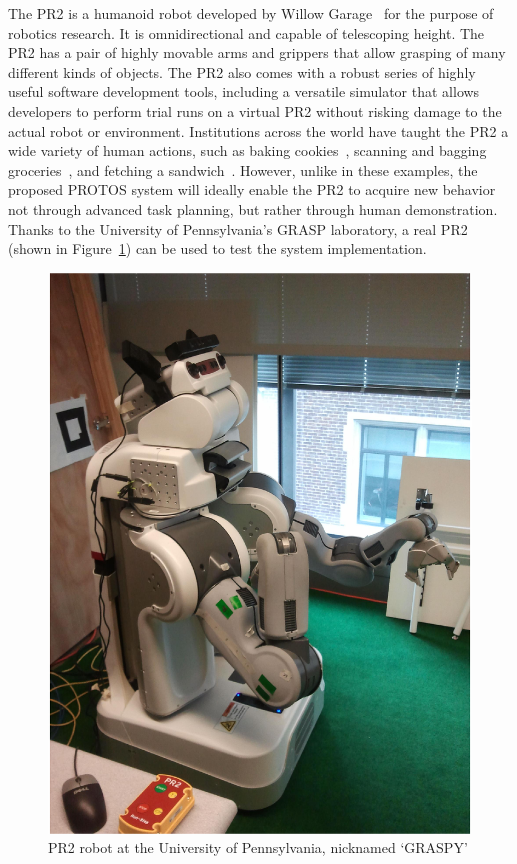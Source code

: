 \documentclass{sig-alternate}
\begin{document}
\indent The PR2 is a humanoid robot developed by  Willow Garage~\cite{pr2} for the purpose of robotics 
research. It is omnidirectional and capable of telescoping height. The PR2 has a pair of highly movable arms and grippers
that allow grasping of many different kinds of objects. The PR2 also comes with a robust series of highly useful software development tools,
including a versatile simulator that allows developers to perform trial runs on a virtual PR2 without
risking damage to the actual robot or environment. Institutions across the
world have taught the PR2 a wide variety of human actions, such as baking 
cookies~\cite{cookies}, scanning and bagging groceries~\cite{groceries}, and fetching a sandwich~\cite{subway}.
 However, unlike in these examples, the proposed PROTOS system will ideally enable the PR2 to acquire new behavior not through advanced task planning,
but rather through human demonstration. Thanks to the University of Pennsylvania's GRASP laboratory, a real PR2 (shown in Figure~\ref{fig:pr2_photo}) can be used to test the
system implementation.

\begin{figure}[htb] 
	\begin{center}
		\includegraphics[width=0.8\linewidth]{graspy}
	\end{center}
	\caption{PR2 robot at the University of Pennsylvania, nicknamed `GRASPY'}
	\label{fig:pr2_photo}
\end{figure}
\end{document}
